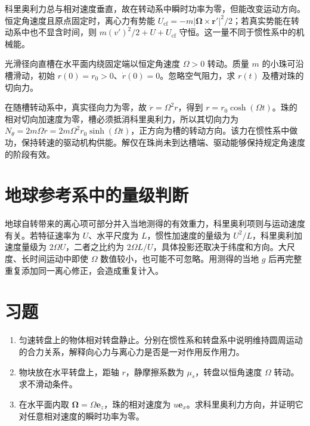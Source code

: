 \documentclass[UTF8,12pt,a4paper,fontset=fandol]{ctexbook}
\begin{document}
科里奥利力总与相对速度垂直，故在转动系中瞬时功率为零，但能改变运动方向。恒定角速度且原点固定时，离心力有势能 $U_{\mathrm{cf}}=-m|\boldsymbol\Omega\times\mathbf r'|^2/2$；若真实势能在转动系中也不显含时间，则 $m(v')^2/2+U+U_{\mathrm{cf}}$ 守恒。这一量不同于惯性系中的机械能。

\begin{example}[旋转直槽中的珠]
光滑径向直槽在水平面内绕固定端以恒定角速度 $\Omega>0$ 转动。质量 $m$ 的小珠可沿槽滑动，初始 $r(0)=r_0>0$、$\dot r(0)=0$。忽略空气阻力，求 $r(t)$ 及槽对珠的切向力。
\end{example}
\begin{solve}
在随槽转动系中，真实径向力为零，故 $\ddot r=\Omega^2r$，得到 $r=r_0\cosh(\Omega t)$。珠的相对切向加速度为零，槽必须抵消科里奥利力，所以其切向力为 $N_\theta=2m\Omega\dot r=2m\Omega^2r_0\sinh(\Omega t)$，正方向为槽的转动方向。该力在惯性系中做功，保持转速的驱动机构供能。解仅在珠尚未到达槽端、驱动能够保持规定角速度的阶段有效。
\end{solve}

\section{地球参考系中的量级判断}
地球自转带来的离心项可部分并入当地测得的有效重力，科里奥利项则与运动速度有关。若特征速率为 $U$、水平尺度为 $L$，惯性加速度的量级为 $U^2/L$，科里奥利加速度量级为 $2\Omega U$，二者之比约为 $2\Omega L/U$，具体投影还取决于纬度和方向。大尺度、长时间运动中即使 $\Omega$ 数值较小，也可能不可忽略。用测得的当地 $g$ 后再完整重复添加同一离心修正，会造成重复计入。

\section{习题}
\begin{enumerate}[label=\thechapter.\arabic*,ref=\thechapter.\arabic*]
\item\label{exr:mech-fictitious} 匀速转盘上的物体相对转盘静止。分别在惯性系和转盘系中说明维持圆周运动的合力关系，解释向心力与离心力是否是一对作用反作用力。
\item\label{exr:mech-turntable} 物块放在水平转盘上，距轴 $r$，静摩擦系数为 $\mu_s$，转盘以恒角速度 $\Omega$ 转动。求不滑动条件。
\item\label{exr:mech-coriolis} 在水平面内取 $\boldsymbol\Omega=\Omega\mathbf e_z$，珠的相对速度为 $u\mathbf e_x$。求科里奥利力方向，并证明它对任意相对速度的瞬时功率为零。
\end{enumerate}
\end{document}
